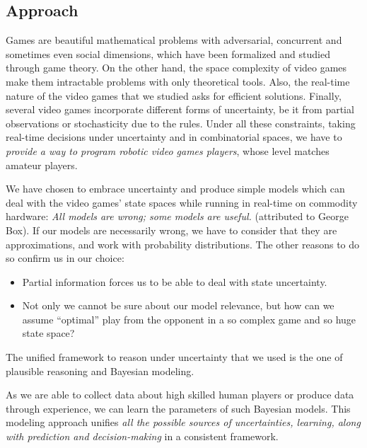 
\subsection{Approach}
Games are beautiful mathematical problems with adversarial, concurrent and sometimes even social dimensions, which have been formalized and studied through game theory. %
On the other hand, the space complexity of video games make them intractable problems with only theoretical tools. Also, the real-time nature of the video games that we studied asks for efficient solutions. Finally, several video games incorporate different forms of uncertainty, be it from partial observations or stochasticity due to the rules. Under all these constraints, taking real-time decisions under uncertainty and in combinatorial spaces, we have to \textit{provide a way to program robotic video games players}, whose level matches amateur players.

We have chosen to embrace uncertainty and produce simple models which can deal with the video games' state spaces while running in real-time on commodity hardware: \textit{All models are wrong; some models are useful.} (attributed to George Box). If our models are necessarily wrong, we have to consider that they are approximations, and work with probability distributions. The other reasons to do so confirm us in our choice:
\begin{itemize}
    \item Partial information forces us to be able to deal with state uncertainty. 
    \item Not only we cannot be sure about our model relevance, but how can we assume ``optimal'' play from the opponent in a so complex game and so huge state space?
\end{itemize}
The unified framework to reason under uncertainty that we used is the one of plausible reasoning and Bayesian modeling.

As we are able to collect data about high skilled human players or produce data through experience, we can learn the parameters of such Bayesian models. This modeling approach unifies \textit{all the possible sources of uncertainties, learning, along with prediction and decision-making} in a consistent framework.

